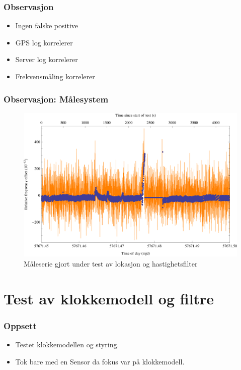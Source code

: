\documentclass[xcolor=table]{beamer}
\begin{document}
\begin{frame}
\frametitle{Observasjon}
      \begin{itemize}
       \setlength\itemsep{2em}
        \item Ingen falske positive
        \item GPS log korrelerer
        \item Server log korrelerer
        \item Frekvensmåling korrelerer
      \end{itemize}
\end{frame}

\begin{frame}
\frametitle{Observasjon: Målesystem}
      \begin{figure}
        \includegraphics[scale=0.70]{thesis/graphics/cns91-and-csac-telemetry-frequency-1.png}
        \caption{Måleserie gjort under test av lokasjon og hastighetsfilter}
      \end{figure}
\end{frame}

\section{Test av klokkemodell og filtre}
\begin{frame}
\frametitle{Oppsett}
  \begin{itemize}
        \setlength\itemsep{2em}
    \item Testet klokkemodellen og styring.
    \item Tok bare med en Sensor da fokus var på klokkemodell.
  \end{itemize}
\end{frame}
\end{document}
